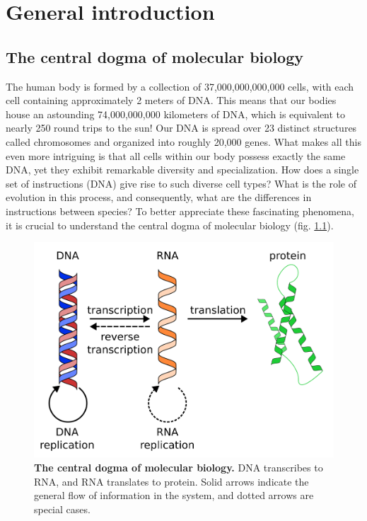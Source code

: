 \chapter{General introduction}\thumbforchapter
\newpage

\section{The central dogma of molecular biology}

The human body is formed by a collection of 37,000,000,000,000 cells\cite{Bianconi2013}, with each cell containing approximately 2 meters of DNA. This means that our bodies house an astounding 74,000,000,000 kilometers of DNA, which is equivalent to nearly 250 round trips to the sun! Our DNA is spread over 23 distinct structures called chromosomes and organized into roughly 20,000 genes. What makes all this even more intriguing is that all cells within our body possess exactly the same DNA, yet they exhibit remarkable diversity and specialization. How does a single set of instructions (DNA) give rise to such diverse cell types? What is the role of evolution in this process, and consequently, what are the differences in instructions between species? To better appreciate these fascinating phenomena, it is crucial to understand the central dogma of molecular biology (fig. \ref{fig:central_dogma}).

\begin{figure}[H]
    \includegraphics[width=\linewidth]{ch.introduction/imgs/central_dogma.png}
    \caption{\textbf{The central dogma of molecular biology.} DNA transcribes to RNA, and RNA translates to protein. Solid arrows indicate the general flow of information in the system, and dotted arrows are special cases.}
    \label{fig:central_dogma}
\end{figure}

